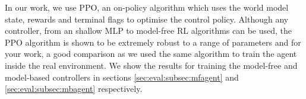 
In our work, we use PPO, an on-policy algorithm which uses the world model state, rewards and terminal flags to optimise the control policy. Although any controller, from an shallow MLP to model-free RL algorithms can be used, the PPO algorithm is shown to be extremely robust to a range of parameters and for your work, a good comparison as we used the same algorithm to train the agent inside the real environment. We show the results for training the model-free and model-based controllers in sections \ref{sec:eval:subsec:mfagent} and \ref{sec:eval:subsec:mbagent} respectively.

% 